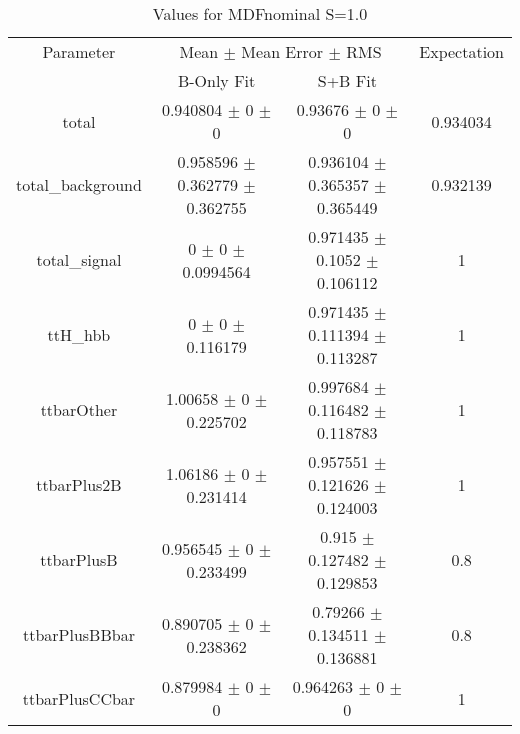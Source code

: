 \begin{table}
\centering
\caption{Values for MDFnominal S=1.0}
\begin{tabular}{cccc}
\toprule
Parameter & \multicolumn{2}{c}{Mean $\pm$ Mean Error $\pm$ RMS} & Expectation\\
 & B-Only Fit & S+B Fit & \\
\midrule
total & \num{0.940804} $\pm$ \num{0} $\pm$ \num{0} & \num{0.93676} $\pm$ \num{0} $\pm$ \num{0} & \num{0.934034}\\
total\_background & \num{0.958596} $\pm$ \num{0.362779} $\pm$ \num{0.362755} & \num{0.936104} $\pm$ \num{0.365357} $\pm$ \num{0.365449} & \num{0.932139}\\
total\_signal & \num{0} $\pm$ \num{0} $\pm$ \num{0.0994564} & \num{0.971435} $\pm$ \num{0.1052} $\pm$ \num{0.106112} & \num{1}\\
ttH\_hbb & \num{0} $\pm$ \num{0} $\pm$ \num{0.116179} & \num{0.971435} $\pm$ \num{0.111394} $\pm$ \num{0.113287} & \num{1}\\
ttbarOther & \num{1.00658} $\pm$ \num{0} $\pm$ \num{0.225702} & \num{0.997684} $\pm$ \num{0.116482} $\pm$ \num{0.118783} & \num{1}\\
ttbarPlus2B & \num{1.06186} $\pm$ \num{0} $\pm$ \num{0.231414} & \num{0.957551} $\pm$ \num{0.121626} $\pm$ \num{0.124003} & \num{1}\\
ttbarPlusB & \num{0.956545} $\pm$ \num{0} $\pm$ \num{0.233499} & \num{0.915} $\pm$ \num{0.127482} $\pm$ \num{0.129853} & \num{0.8}\\
ttbarPlusBBbar & \num{0.890705} $\pm$ \num{0} $\pm$ \num{0.238362} & \num{0.79266} $\pm$ \num{0.134511} $\pm$ \num{0.136881} & \num{0.8}\\
ttbarPlusCCbar & \num{0.879984} $\pm$ \num{0} $\pm$ \num{0} & \num{0.964263} $\pm$ \num{0} $\pm$ \num{0} & \num{1}\\
\bottomrule
\end{tabular}
\end{table}